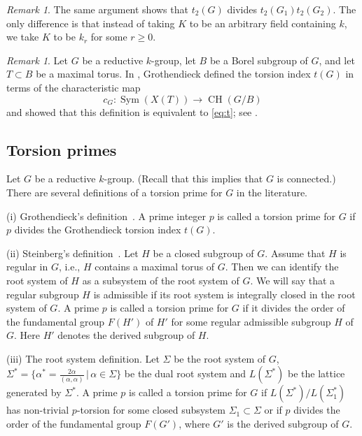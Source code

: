 \documentclass[12pt]{amsart}
\numberwithin{equation}{section}
\theoremstyle{remark}
\newtheorem{remark}[theorem]{Remark}
\begin{document}
\begin{remark} The same argument shows that $t_2(G)$ divides $t_2(G_1)t_2(G_2)$. The only difference is that instead of taking $K$ to be an arbitrary field containing $k$, we take $K$ to be $k_r$ for some $r \geqslant 0$. 
\end{remark}

\begin{remark} \label{rem.chow} 
    Let $G$ be a reductive $k$-group, let $B$ be a Borel subgroup of $G$, and let $T \subset B$ be a maximal torus. In \cite[Chapter 4]{grothendieck-special}, Grothendieck defined the torsion index $t(G)$ in terms of the characteristic map 
\[ c_G \colon \operatorname{Sym}(X(T)) \longrightarrow \operatorname{CH}(G/B)\]
and showed that this definition is equivalent to \eqref{eq:t}; see \cite[Theorem 2]{grothendieck-special}.
\end{remark}

\subsection{Torsion primes}
Let $G$ be a reductive $k$-group. (Recall that this implies that $G$ is connected.) There are several definitions of a torsion prime for $G$ in the literature.

\smallskip
(i) Grothendieck's definition~\cite[Definition 3]{grothendieck-special}. A prime integer $p$ is called a torsion prime for $G$ if $p$ divides the Grothendieck torsion index $t(G)$.

\smallskip
(ii) Steinberg's definition~\cite[Definition 2.1]{steinberg-torsion}. Let $H$ be a closed subgroup of $G$. Assume that $H$ is regular in $G$, i.e., $H$ contains a maximal torus of $G$. Then we can identify the root system of $H$ as a subsystem of the root system of $G$. We will say that a regular subgroup $H$ is admissible if its root system is integrally closed in the root system of $G$. A prime $p$ is called a torsion prime for $G$ if it divides the order of the fundamental group $F(H')$ of $H'$ for some regular admissible subgroup $H$ of $G$. Here $H'$ denotes the derived subgroup of $H$.

\smallskip
(iii) The root system definition. Let $\Sigma$ be the root system of $G$, $\Sigma^* = \{ \alpha^* = \frac{2 \alpha}{(\alpha, \alpha)} \, | \, \alpha \in \Sigma \}$ be the dual root system and $L(\Sigma^*)$ be the lattice generated by $\Sigma^*$. 
A prime $p$ is called a torsion prime for $G$ if $L(\Sigma^*)/L(\Sigma_1^*)$ has non-trivial $p$-torsion for some closed subsystem $\Sigma_1 \subset \Sigma$ or if $p$ divides the order of the fundamental group $F(G')$, where $G'$ is the derived subgroup of $G$.
\end{document}
